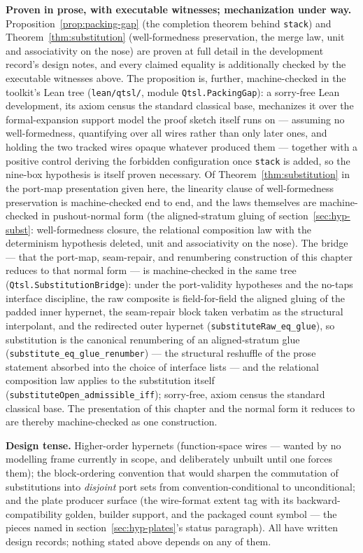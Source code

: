 \textbf{Proven in prose, with executable witnesses; mechanization
under way.} Proposition~\ref{prop:packing-gap} (the completion
theorem behind \texttt{stack}) and Theorem~\ref{thm:substitution}
(well-formedness preservation, the merge law, unit and associativity
on the nose) are proven at full detail in the development record's
design notes, and every claimed equality is additionally checked by
the executable witnesses above. The proposition is, further,
machine-checked in the toolkit's Lean tree (\texttt{lean/qtsl/},
module \texttt{Qtsl.PackingGap}): a sorry-free Lean development, its axiom
census the standard classical base, mechanizes it over the formal-expansion
support model the proof sketch itself runs on --- assuming no
well-formedness, quantifying over all wires rather than only later
ones, and holding the two tracked wires opaque whatever produced
them --- together with a positive control deriving
the forbidden configuration once \texttt{stack} is added, so the
nine-box hypothesis is itself proven necessary. Of
Theorem~\ref{thm:substitution} in the port-map presentation given
here, the linearity clause of well-formedness preservation is
machine-checked end to end, and the laws themselves are
machine-checked in pushout-normal form (the aligned-stratum gluing
of section~\ref{sec:hyp-subst}: well-formedness closure, the
relational composition law with the determinism hypothesis deleted,
unit and associativity on the nose). The bridge --- that the
port-map, seam-repair, and renumbering construction of this chapter
reduces to that normal form --- is machine-checked in the same tree
(\texttt{Qtsl.SubstitutionBridge}): under the port-validity
hypotheses and the no-taps interface discipline, the raw composite
is field-for-field the aligned gluing of the padded inner hypernet,
the seam-repair block taken verbatim as the structural interpolant,
and the redirected outer hypernet
(\texttt{substituteRaw\_eq\_glue}), so substitution is the canonical
renumbering of an aligned-stratum glue
(\texttt{substitute\_eq\_glue\_renumber}) --- the structural
reshuffle of the prose statement absorbed into the choice of
interface lists --- and the relational composition law applies to
the substitution itself
(\texttt{substituteOpen\_admissible\_iff}); sorry-free, axiom census
the standard classical base.  The presentation of this chapter and
the normal form it reduces to are thereby machine-checked as one
construction.

\textbf{Design tense.} Higher-order hypernets (function-space wires
--- wanted by no modelling frame currently in scope, and deliberately
unbuilt until one forces them); the block-ordering convention that
would sharpen the commutation of substitutions into \emph{disjoint}
port sets from convention-conditional to unconditional; and the
plate producer surface (the wire-format extent tag with its
backward-compatibility golden, builder support, and the packaged
count symbol --- the pieces named in
section~\ref{sec:hyp-plates}'s status paragraph). All have written
design records; nothing stated above depends on any of them.
